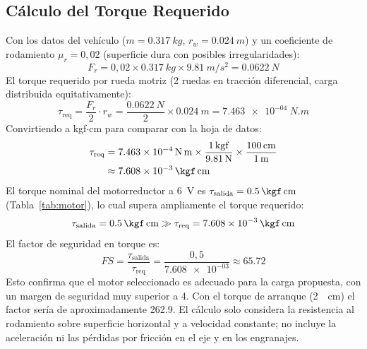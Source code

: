 \documentclass[conference]{IEEEtran}
\newcommand{\valMassKg}{0.317}
\newcommand{\valWheelRadiusM}{0.024}
\newcommand{\valRollingForceN}{0.0622}
\newcommand{\valRequiredTorqueNm}{7.463e-04}
\newcommand{\valRequiredTorqueKgfCm}{7.608e-03}
\newcommand{\valSafetyRated}{65.72}
\newcommand{\valSafetyStall}{262.9}
\begin{document}
\subsection{Cálculo del Torque Requerido}
Con los datos del vehículo ($m = \SI{\valMassKg}{kg}$, $r_w = \SI{\valWheelRadiusM}{m}$) y un coeficiente de rodamiento $\mu_r = 0{,}02$ (superficie dura con posibles irregularidades):
\begin{equation}
F_r = 0{,}02 \times \SI{\valMassKg}{kg} \times \SI{9.81}{m/s^2} = \SI{\valRollingForceN}{N}
\end{equation}
El torque requerido por rueda motriz (2 ruedas en tracción diferencial, carga distribuida equitativamente):
\begin{equation}
\tau_{\text{req}} = \frac{F_r}{2}\cdot r_w = \frac{\SI{\valRollingForceN}{N}}{2}\times\SI{\valWheelRadiusM}{m} = \SI{\valRequiredTorqueNm}{N.m}
\end{equation}
Convirtiendo a kgf$\cdot$cm para comparar con la hoja de datos:
\begin{equation}
\begin{aligned}
\tau_{\text{req}} &= \SI{\valRequiredTorqueNm}{N.m}\times\frac{\SI{1}{kgf}}{\SI{9.81}{N}}\times\frac{\SI{100}{cm}}{\SI{1}{m}}\\
&\approx \SI{\valRequiredTorqueKgfCm}{\kgf.cm}
\end{aligned}
\end{equation}
El torque nominal del motorreductor a \SI{6}{V} es $\tau_{\text{salida}} = \SI{0.5}{\kgf.cm}$ (Tabla~\ref{tab:motor}), lo cual supera ampliamente el torque requerido:
\begin{equation}
\tau_{\text{salida}} = \SI{0.5}{\kgf.cm} \gg \tau_{\text{req}} = \SI{\valRequiredTorqueKgfCm}{\kgf.cm}
\end{equation}
El factor de seguridad en torque es:
\begin{equation}
FS = \frac{\tau_{\text{salida}}}{\tau_{\text{req}}} = \frac{0{,}5}{\num{\valRequiredTorqueKgfCm}} \approx \num{\valSafetyRated}
\end{equation}
Esto confirma que el motor seleccionado es adecuado para la carga propuesta, con un margen de seguridad muy superior a 4. Con el torque de arranque (\SI{2}{\kgf.cm}) el factor sería de aproximadamente \num{\valSafetyStall}. El cálculo solo considera la resistencia al rodamiento sobre superficie horizontal y a velocidad constante; no incluye la aceleración ni las pérdidas por fricción en el eje y en los engranajes.
\end{document}
